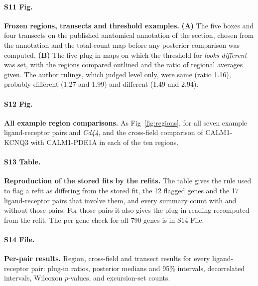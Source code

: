 \documentclass[10pt,letterpaper]{article}
\begin{document}
\paragraph*{S11 Fig.}
\label{S11_Fig}
\textbf{Frozen regions, transects and threshold examples.} \textbf{(A)} The five boxes and four transects on the published anatomical annotation of the section, chosen from the annotation and the total-count map before any posterior comparison was computed. \textbf{(B)} The five plug-in maps on which the threshold for \textit{looks different} was set, with the regions compared outlined and the ratio of regional averages given. The author rulings, which judged level only, were same (ratio 1.16), probably different (1.27 and 1.99) and different (1.49 and 2.94).

\paragraph*{S12 Fig.}
\label{S12_Fig}
\textbf{All example region comparisons.} As Fig~\ref{fig:regions}, for all seven example ligand-receptor pairs and \textit{Cd44}, and the cross-field comparison of CALM1-KCNQ3 with CALM1-PDE1A in each of the ten regions.

\paragraph*{S13 Table.}
\label{S13_Table}
\textbf{Reproduction of the stored fits by the refits.} The table gives the rule used to flag a refit as differing from the stored fit, the 12 flagged genes and the 17 ligand-receptor pairs that involve them, and every summary count with and without those pairs. For those pairs it also gives the plug-in reading recomputed from the refit. The per-gene check for all 790 genes is in S14 File.

\paragraph*{S14 File.}
\label{S14_File}
\textbf{Per-pair results.} Region, cross-field and transect results for every ligand-receptor pair: plug-in ratios, posterior medians and 95\% intervals, decorrelated intervals, Wilcoxon $p$-values, and excursion-set counts.
\end{document}
